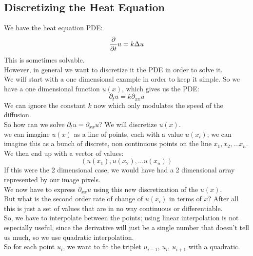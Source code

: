 \documentclass[12pt]{article}
\begin{document}
\subsection*{Discretizing the Heat Equation}

We have the heat equation PDE:
\[ \dfrac{\partial }{\partial t} u = k \Delta u \]
This is sometimes solvable. \\

However, in general we want to discretize it
the PDE in order to solve it. \\

We will start with a one dimensional example
in order to keep it simple.
So we have a one dimensional function $u(x)$,
which gives us the PDE:
\[ \partial_t u = k \partial_{xx} u\]
We can ignore the constant $k$
now which only modulates the speed of 
the diffusion. \\

So how can we solve $\partial_t u =\partial_{xx} u$?
We will discretize $u(x)$. \\
we can imagine $u(x)$ as a line of points,
each with a value $u(x_i)$;
we can imagine this as a bunch of discrete,
non continuous points
on the line $x_1, x_2, \dots x_n$. \\
We then end up with a vector of values:
\[ (u(x_1), u(x_2), \dots u(x_n)) \]
If this were the 2 dimensional case, 
we would have had a 2 dimensional array
represented by our image pixels. \\

We now have to express $\partial_{xx} u$
using this new discretization of the $u(x)$. \\
But what is the second order rate of change of $u(x_i)$
in terms of $x$? After all this is just a set of
values that are in no way continuous or differentiable. \\

So, we have to interpolate between the points;
using linear interpolation is not especially useful,
since the derivative will just be a single
number that doesn't tell us much,
so we use quadratic interpolation. \\
So for each point $u_i$,
we want to fit the triplet $u_{i-1}$, $u_{i}$,
$u_{i+1}$ with a quadratic.
\end{document}
